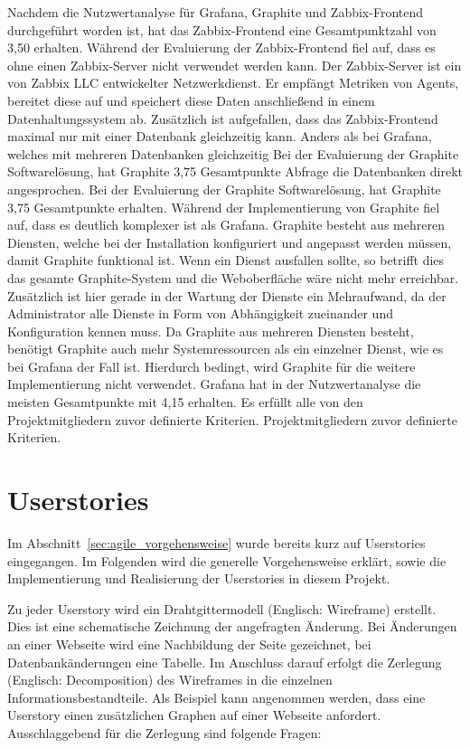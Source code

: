 {Nachdem die Nutzwertanalyse für Grafana, Graphite und Zabbix\hyp{}Frontend
durchgeführt worden ist, hat das Zabbix\hyp{}Frontend eine Gesamtpunktzahl von
3,50 erhalten. Während der Evaluierung der Zabbix\hyp{}Frontend fiel auf, dass
es ohne einen Zabbix\hyp{}Server nicht verwendet werden kann. Der
Zabbix\hyp{}Server ist ein von Zabbix LLC entwickelter Netzwerkdienst. Er
empfängt Metriken von Agents, bereitet diese auf und speichert diese Daten
anschließend in einem Datenhaltungssystem ab. Zusätzlich ist aufgefallen, dass
das Zabbix\hyp{}Frontend maximal nur mit einer Datenbank gleichzeitig
kann. Anders als bei Grafana, welches mit mehreren Datenbanken gleichzeitig
Bei der Evaluierung der Graphite Softwarelösung, hat Graphite 3,75 Gesamtpunkte
Abfrage die Datenbanken direkt angesprochen. Bei der Evaluierung der Graphite
Softwarelösung, hat Graphite 3,75 Gesamtpunkte erhalten. Während der
Implementierung von Graphite fiel auf, dass es deutlich komplexer ist als
Grafana. Graphite besteht aus mehreren Diensten, welche bei der Installation
konfiguriert und angepasst werden müssen, damit Graphite funktional ist. Wenn
ein Dienst ausfallen sollte, so betrifft dies das gesamte Graphite-System und
die Weboberfläche wäre nicht mehr erreichbar. Zusätzlich ist hier gerade in der
Wartung der Dienste ein Mehraufwand, da der Administrator alle Dienste in Form
von Abhängigkeit zueinander und Konfiguration kennen muss. Da Graphite aus
mehreren Diensten besteht, benötigt Graphite auch mehr Systemressourcen als ein
einzelner Dienst, wie es bei Grafana der Fall ist. Hierdurch bedingt, wird
Graphite für die weitere Implementierung nicht verwendet. Grafana hat in der
Nutzwertanalyse die meisten Gesamtpunkte mit 4,15 erhalten. Es erfüllt alle von
den Projektmitgliedern zuvor definierte Kriterien.
Projektmitgliedern zuvor definierte Kriterien.
\mr%

\chapter{Userstories}
Im Abschnitt~\ref{sec:agile_vorgehensweise} wurde bereits kurz auf Userstories
eingegangen. Im Folgenden wird die generelle Vorgehensweise erklärt, sowie die
Implementierung und Realisierung der Userstories in diesem Projekt.

Zu jeder Userstory wird ein Drahtgittermodell (Englisch: Wireframe) erstellt.
Dies ist eine schematische Zeichnung der angefragten Änderung. Bei Änderungen
an einer Webseite wird eine Nachbildung der Seite gezeichnet, bei
Datenbankänderungen eine Tabelle. Im Anschluss darauf erfolgt die Zerlegung
(Englisch: Decomposition) des Wireframes in die einzelnen
Informationsbestandteile. Als Beispiel kann angenommen werden, dass eine
Userstory einen zusätzlichen Graphen auf einer Webseite anfordert.
Ausschlaggebend für die Zerlegung sind folgende Fragen:

}
